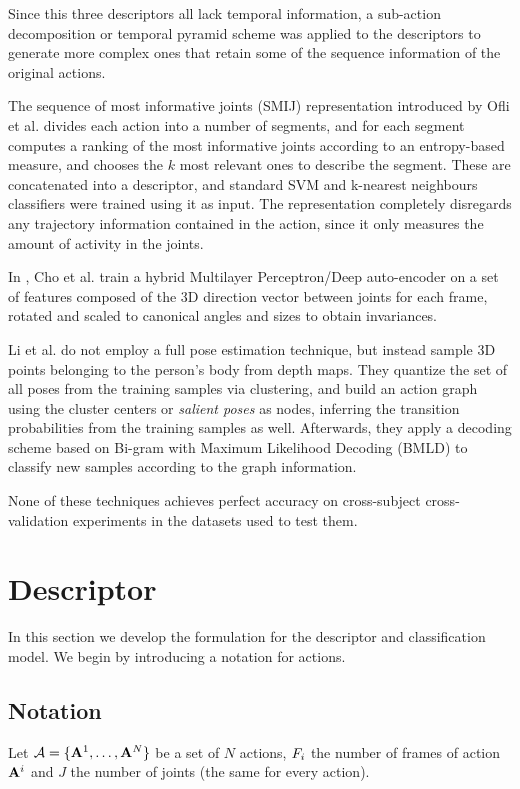 \documentclass{fcs}
\begin{document}
Since this three descriptors all lack temporal information, a sub-action decomposition or temporal pyramid scheme was applied to the descriptors to generate more complex ones that retain some of the sequence information of the original actions.

The sequence of most informative joints (SMIJ) representation introduced by Ofli et al. \cite{ofli2014sequence} divides each action into a number of segments, and for each segment computes a ranking of the most informative joints according to an entropy-based measure, and chooses the $k$ most relevant ones to describe the segment. These are concatenated into a descriptor, and standard SVM and k-nearest neighbours classifiers were trained using it as input. The representation completely disregards any trajectory information contained in the action, since it only measures the amount of activity in the joints.

In \cite{cho2013classifying}, Cho et al. train a hybrid Multilayer Perceptron/Deep auto-encoder on a set of features composed of the 3D direction vector between joints for each frame, rotated and scaled to canonical angles and sizes to obtain invariances.

Li et al. \cite{li2010action} do not employ a full pose estimation technique, but instead sample 3D points belonging to the person's body from depth maps. They quantize the set of all poses from the training samples via clustering, and build an action graph using the cluster centers or \textit{salient poses} as nodes, inferring the transition probabilities from the training samples as well. Afterwards, they apply a decoding scheme based on Bi-gram with Maximum Likelihood Decoding (BMLD) to classify new samples according to the graph information.

None of these techniques achieves perfect accuracy on cross-subject cross-validation experiments in the datasets used to test them.





 
\section{Descriptor}
\label{descriptor}


In this section we develop the formulation for the descriptor and classification model. We begin by introducing a notation for actions.

\subsection{Notation}
Let $\mathcal{A}=\{ \mathbf{A}^1,\dots,\mathbf{A}^N\}$ be a set of $N$ actions, $F_i$ the number of frames of action $\mathbf{A}^i$ and $J$ the number of joints (the same for every action). 
\end{document}
